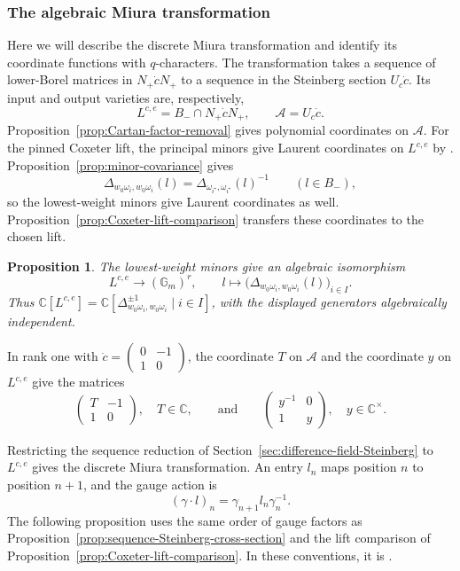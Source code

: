 \documentclass[11pt,leqno]{amsart}
\numberwithin{equation}{section}
\theoremstyle{plain}
\newtheorem{proposition}[theorem]{Proposition}
\theoremstyle{definition}
\theoremstyle{plain}
\theoremstyle{definition}
\theoremstyle{remark}
\begin{document}
\subsubsection{The algebraic Miura transformation}\label{sec:discrete-Miura-qcharacters}
Here we will describe the discrete Miura transformation and identify its coordinate functions with $q$-characters. The transformation takes a sequence of lower-Borel matrices in $N_+\dot cN_+$ to a sequence in the Steinberg section $U_c\dot c$. Its input and output varieties are, respectively,
\[
 L^{c,e}=B_-\cap N_+\dot cN_+,\qquad \mathcal A=U_c\dot c.
\]
Proposition~\ref{prop:Cartan-factor-removal} gives polynomial coordinates on $\mathcal A$.  For the pinned Coxeter lift, the principal minors give Laurent coordinates on $L^{c,e}$ by \cite[Section~2.2]{FL2025}.  Proposition~\ref{prop:minor-covariance} gives
\[
 \Delta_{w_0\omega_i,w_0\omega_i}(l)
 =\Delta_{\omega_{i^\star},\omega_{i^\star}}(l)^{-1}
 \qquad(l\in B_-),
\]
so the lowest-weight minors give Laurent coordinates as well.  Proposition~\ref{prop:Coxeter-lift-comparison} transfers these coordinates to the chosen lift.

\begin{proposition}\label{prop:Steinberg-Miura-coordinate-rings}
The lowest-weight minors give an algebraic isomorphism
\[
 L^{c,e}\longrightarrow(\mathbb G_m)^r,
 \qquad l\longmapsto
       \bigl(\Delta_{w_0\omega_i,w_0\omega_i}(l)\bigr)_{i\in I}.
\]
Thus $\mathbb C[L^{c,e}]=\mathbb C[\Delta_{w_0\omega_i,w_0\omega_i}^{\pm1}\mid i\in I]$, with the displayed generators algebraically independent.
\end{proposition}

In rank one with $\dot c=\left(\begin{smallmatrix}0&-1\\1&0\end{smallmatrix}\right)$, the coordinate $T$ on $\mathcal A$ and the coordinate $y$ on $L^{c,e}$ give the matrices
\[
 \begin{pmatrix}T&-1\\1&0\end{pmatrix},\quad T\in\mathbb C,
 \qquad\text{and}\qquad
 \begin{pmatrix}y^{-1}&0\\1&y\end{pmatrix},\quad y\in\mathbb C^\times.
\]

Restricting the sequence reduction of Section~\ref{sec:difference-field-Steinberg} to $L^{c,e}$ gives the discrete Miura transformation. An entry $l_n$ maps position $n$ to position $n+1$, and the gauge action is
\[
 (\gamma\cdot l)_n=\gamma_{n+1}l_n\gamma_n^{-1}.
\]
The following proposition uses the same order of gauge factors as Proposition~\ref{prop:sequence-Steinberg-cross-section} and the lift comparison of Proposition~\ref{prop:Coxeter-lift-comparison}. In these conventions, it is \cite[Corollary~39]{FL2025}.
\end{document}
